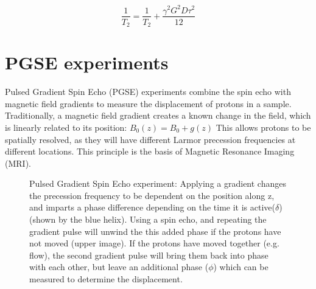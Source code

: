 \begin{equation}
\frac{1}{T_2} = \frac{1}{T_2} + \frac{\gamma^2 G^2 D \tau^2}{12}
\label{eq:CPMGgrad}
\end{equation}

\section{PGSE experiments}
\label{sec:back-PGSE}
Pulsed Gradient Spin Echo (PGSE) experiments combine the spin echo with magnetic field gradients to measure the displacement of protons in a sample.
Traditionally, a magnetic field gradient creates a known change in the \Bzero field, which is linearly related to its position: $B_0(z) = B_0 + g(z)$
This allows protons to be spatially resolved, as they will have different Larmor precession frequencies at different locations.
This principle is the basis of Magnetic Resonance Imaging (MRI).

\begin{figure}[t]
\centering
{}
\caption[Pulsed Gradient Spin Echo (PGSE) experiment]{Pulsed Gradient Spin Echo experiment: Applying a gradient changes the precession frequency to be dependent on the position along z, and imparts a phase difference depending on the time it is active($\delta$) (shown by the blue helix). Using a spin echo, and repeating the gradient pulse will unwind the this added phase if the protons have not moved (upper image). If the protons have moved together (e.g. flow), the second gradient pulse will bring them back into phase with each other, but leave an additional phase ($\phi$) which can be measured to determine the displacement.}
\label{fig:back-pgse}
\end{figure}

